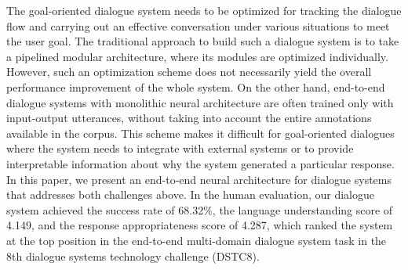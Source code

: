 The goal-oriented dialogue system needs to be optimized for tracking the dialogue flow and carrying out an effective conversation under various situations to meet the user goal. The traditional approach to build such a dialogue system is to take a pipelined modular architecture, where its modules are optimized individually. However, such an optimization scheme does not necessarily yield the overall performance improvement of the whole system. On the other hand, end-to-end dialogue systems with monolithic neural architecture are often trained only with input-output utterances, without taking into account the entire annotations available in the corpus. This scheme makes it difficult for goal-oriented dialogues where the system needs to integrate with external systems or to provide interpretable information about why the system generated a particular response. In this paper, we present an end-to-end neural architecture for dialogue systems that addresses both challenges above. In the human evaluation, our dialogue system achieved the success rate of 68.32\%, the language understanding score of 4.149, and the response appropriateness score of 4.287, which ranked the system at the top position in the end-to-end multi-domain dialogue system task in the 8th dialogue systems technology challenge (DSTC8).
